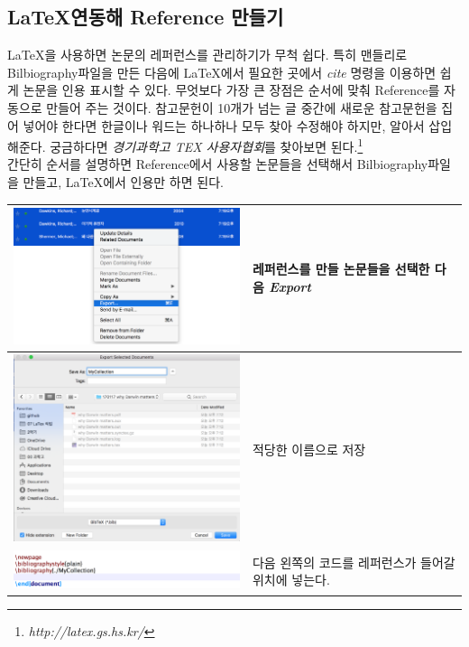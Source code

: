 \documentclass[11pt]{article}
\begin{document}
\newpage
\subsection{\LaTeX 연동해 Reference 만들기}
\LaTeX 을 사용하면 논문의 레퍼런스를 관리하기가 무척 쉽다. 특히 맨들리로 Bilbiography파일을 만든 다음에 \LaTeX 에서 필요한 곳에서 \textit{cite} 명령을 이용하면 쉽게 논문을 인용 표시할 수 있다. 무엇보다 가장 큰 장점은 순서에 맞춰 Reference를 자동으로 만들어 주는 것이다. 참고문헌이 10개가 넘는 글 중간에 새로운 참고문헌을 집어 넣어야 한다면 한글이나 워드는 하나하나 모두 찾아 수정해야 하지만,  알아서 삽입해준다.  궁금하다면 \textit{경기과학고 TEX 사용자협회}를 찾아보면 된다.\footnote{\textit{http://latex.gs.hs.kr/}} \\
간단히 순서를 설명하면 Reference에서 사용할 논문들을 선택해서 Bilbiography파일을 만들고, \LaTeX 에서 인용만 하면 된다.\\

\begin{tabular}[h]{ m{11cm} m{50mm} }
	\hline
	\includegraphics[width=10cm]{./image/latex_bibliography1.png} & 레퍼런스를 만들 논문들을 선택한 다음 \textit{Export}\\
	\hline
	\includegraphics[width=10cm]{./image/latex_bibliography2.png} & 적당한 이름으로 저장\\
	\hline
	\includegraphics[width=10cm]{./image/latex_bibliography3.png} &  다음 왼쪽의 코드를 레퍼런스가 들어갈 위치에 넣는다. \\
	\hline
	
\end{tabular}
\end{document}

